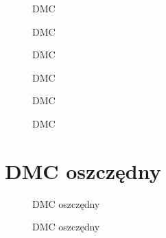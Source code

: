 \begin{figure}[H]
    \centering
    
    \caption{DMC}
\end{figure}


\begin{figure}[H]
    \centering
    
    \caption{DMC}
\end{figure}


\begin{figure}[H]
    \centering
    
    \caption{DMC}
\end{figure}


\begin{figure}[H]
    \centering
    
    \caption{DMC}
\end{figure}


\begin{figure}[H]
    \centering
    
    \caption{DMC}
\end{figure}

\begin{figure}[H]
    \centering
    
    \caption{DMC}
\end{figure}

\section{DMC oszczędny}

\begin{figure}[H]
    \centering
    
    \caption{DMC oszczędny}
\end{figure}

\begin{figure}[H]
    \centering
    
    \caption{DMC oszczędny}
\end{figure}

